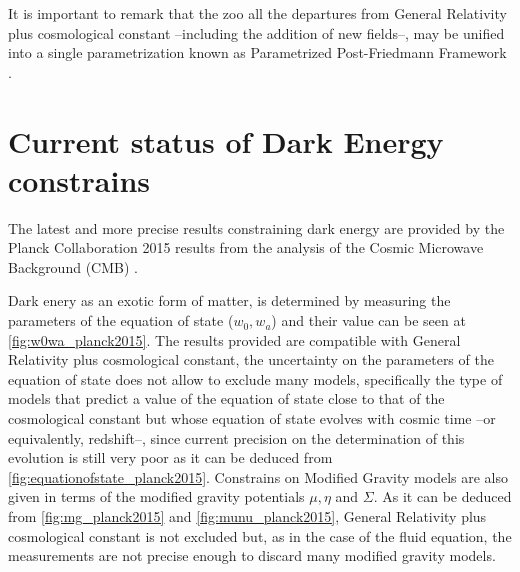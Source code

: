 It is important to remark that the zoo all the departures from General Relativity plus cosmological constant --including the addition of new fields--, may be unified into a single parametrization known as Parametrized Post-Friedmann Framework \cite{2013PhRvD..87b4015B}.

\section{Current status of Dark Energy constrains}
The latest and more precise results constraining dark energy are provided by the Planck Collaboration 2015 results from the analysis of the Cosmic Microwave Background (CMB) \cite{2016A&A...594A..14P}.
\newline

Dark enery as an exotic form of matter, is determined by measuring the parameters of the equation of state ($w_0,w_a$) and their value can be seen at \autoref{fig:w0wa_planck2015}. The results provided are compatible with General Relativity plus cosmological constant, the uncertainty on the parameters of the equation of state does not allow to exclude many models, specifically the type of models that predict a value of the equation of state close to that of the cosmological constant but whose equation of state evolves with cosmic time --or equivalently, redshift--, since current precision on the determination of this evolution is still very poor as it can be deduced from \autoref{fig:equationofstate_planck2015}. Constrains on Modified Gravity models are also given in terms of the modified gravity potentials $\mu,\eta$ and $\Sigma$. As it can be deduced from \autoref{fig:mg_planck2015} and \autoref{fig:munu_planck2015}, General Relativity plus cosmological constant is not excluded but, as in the case of the fluid equation, the measurements are not precise enough to discard many modified gravity models.
\newline

